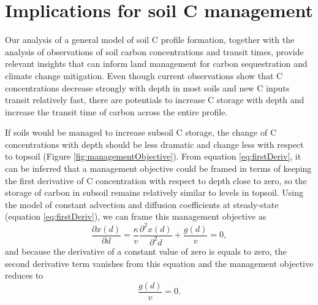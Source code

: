 \documentclass[11pt, oneside, a4paper]{article}   	%
\begin{document}
\section{Implications for soil C management}
Our analysis of a general model of soil C profile formation, together with the analysis of observations of soil carbon concentrations and transit times, provide relevant insights that can inform land management for carbon sequestration and climate change mitigation. 
Even though current observations show that C concentrations decrease strongly with depth in most soils and new C inputs transit relatively fast, there are potentials to increase C storage with depth and increase the transit time of carbon across the entire profile. 

If soils would be managed to increase subsoil C storage, the change of C concentrations with depth should be less dramatic and change less with respect to topsoil (Figure \ref{fig:managementObjective}). From equation \ref{eq:firstDeriv}, it can be inferred that a management objective could be framed in terms of keeping the first derivative of C concentration with respect to depth close to zero, so the storage of carbon in subsoil remains relatively similar to levels in topsoil. Using the model of constant advection and diffusion coefficients at steady-state (equation \ref{eq:firstDeriv}), we can frame this management objective as 
\begin{equation}
\frac{\partial x(d)}{\partial d} = \frac{\kappa}{v} \frac{\partial^2 x(d)}{\partial^2 d} + \frac{g(d)}{v} = 0,
\end{equation} 
and because the derivative of a constant value of zero is equals to zero, the second derivative term vanishes from this equation and the management objective reduces to
\begin{equation} \label{eq:objective}
 \frac{g(d)}{v} = 0.
\end{equation} 
\end{document}
